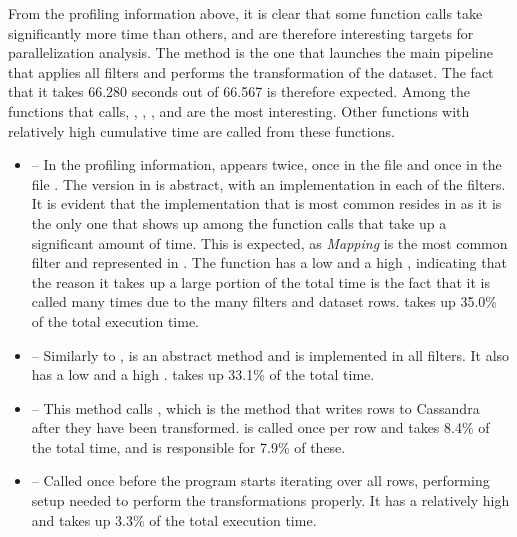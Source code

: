 %  

From the profiling information above, it is clear that some function calls take significantly more time than others, and are therefore
interesting targets for parallelization analysis. The  method is the one that launches the main pipeline that applies all
filters and performs the transformation of the dataset. The fact that it takes 66.280 seconds out of 66.567 is therefore expected. Among
the functions that  calls, , , , and  are the most
interesting. Other functions with relatively high cumulative time are called from these functions.
\begin{itemize}
  \item {} -- In the profiling information,  appears twice, once in the file  and once in the file
    . The version in  is abstract, with an implementation in each of the filters. It is evident that the implementation
    that is most common resides in  as it is the only one that shows up among the function calls that take up a significant amount of time.
    This is expected, as \textit{Mapping} is the most common filter and represented in . The function has a low  and a high
    , indicating that the reason it takes up a large portion of the total time is the fact that it is called many times due to the many filters
    and dataset rows.  takes up 35.0\% of the total execution time.
  \item {} -- Similarly to ,  is an abstract method and is implemented in all filters.
    It also has a low  and a high .  takes up 33.1\% of the total time.
  \item {} -- This method calls , which is the method that writes rows to Cassandra after they have been transformed.
     is called once per row and takes 8.4\% of the total time, and  is responsible for 7.9\% of these. 
  \item {} -- Called once before the program starts iterating over all rows, performing setup needed to perform the transformations properly.
    It has a relatively high  and takes up 3.3\% of the total execution time.
\end{itemize}
